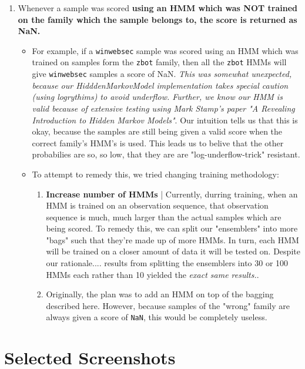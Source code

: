 \documentclass[12pt]{article}
\begin{document}
  \begin{enumerate}
    \item Whenever a sample was scored \textbf{using an HMM which was NOT trained on the family which the sample belongs to, the score is returned as NaN.} 
      \begin{itemize}
        \item For example, if a \texttt{winwebsec} sample was scored using an HMM which was trained on samples form the \texttt{zbot} family, then all the \texttt{zbot} HMMs will give \texttt{winwebsec} samples a score of NaN. \textit{This was somewhat unexpected, because our HidddenMarkovModel implementation takes special caution (using logrythims) to avoid underflow. Further, we know our HMM is valid because of extensive testing using Mark Stamp's paper "A Revealing Introduction to Hidden Markov Models"}. Our intuition tells us that this is okay, because the samples are still being given a valid score when the correct family's HMM's is used. This leads us to belive that the other probabilies are so, so low, that they are are "log-underflow-trick" resistant.
        \item To attempt to remedy this, we tried changing training methodology:
          \begin{enumerate}
            \item \textbf{Increase number of HMMs} | Currently, durring training, when an HMM is trained on an observation sequence, that observation sequence is much, much larger than the actual samples which are being scored. To remedy this, we can split our "ensemblers" into more "bags" such that they're made up of more HMMs. In turn, each HMM will be trained on a closer amount of data it will be tested on. Despite our rationale.... results from splitting the ensemblers into 30 or 100 HMMs each rather than 10 yielded the \textit{exact same results.}.
        \item Originally, the plan was to add an HMM on top of the bagging described here. However, because samples of the "wrong" family are always given a score of \texttt{NaN}, this would be completely useless.
          \end{enumerate}
     \end{itemize}
  \end{enumerate}

\appendix

\section{Selected Screenshots}
  
\end{document}

